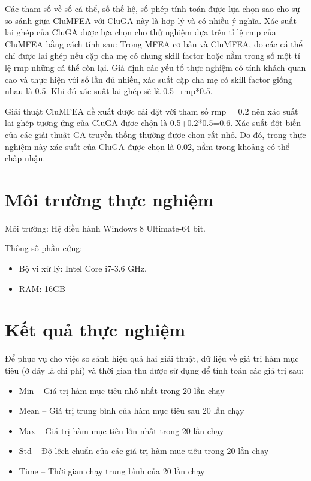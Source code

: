   

Các tham số về số cá thể, số thế hệ, số phép tính toán được lựa chọn sao cho sự so sánh giữa CluMFEA với CluGA này là hợp lý và có nhiều ý nghĩa. Xác suất lai ghép của CluGA được lựa chọn cho thử nghiệm dựa trên tỉ lệ rmp của CluMFEA bằng cách tính sau: Trong MFEA cơ bản và CluMFEA, do các cá thể chỉ được lai ghép nếu cặp cha mẹ có chung skill factor hoặc nằm trong số một tỉ lệ rmp những cá thể còn lại. Giả định các yếu tố thực nghiệm có tính khách quan cao và thực hiện với số lần đủ nhiều, xác suất cặp cha mẹ có skill factor giống nhau là 0.5. Khi đó xác suất lai ghép sẽ là 0.5+rmp*0.5.

Giải thuật CluMFEA đề xuất được cài đặt với tham số rmp = 0.2 nên xác suất lai ghép tương ứng của CluGA được chộn là 0.5+0.2*0.5=0.6. Xác suất đột biến của các giải thuật GA truyền thống thường được chọn rất nhỏ. Do đó, trong thực nghiệm này xác suất của CluGA được chọn là 0.02, nằm trong khoảng có thể chấp nhận.

\section{Môi trường thực nghiệm}
Môi trường: Hệ điều hành Windows 8 Ultimate-64 bit.

Thông số phần cứng:
\begin{itemize}
\item Bộ vi xử lý: Intel Core i7-3.6 GHz.
\item RAM: 16GB
\end{itemize}

\section{Kết quả thực nghiệm} \label{chap_mfeaProposed:sec:ketqua}
Để phục vụ cho việc so sánh hiệu quả hai giải thuật, dữ liệu về giá trị hàm mục tiêu (ở đây là chi phí) và thời gian thu được sử dụng để tính toán các giá trị sau:

\begin{itemize}
	\item Min – Giá trị hàm mục tiêu nhỏ nhất trong 20 lần chạy
	\item Mean – Giá trị trung bình của hàm mục tiêu sau 20 lần chạy
	\item Max – Giá trị hàm mục tiêu lớn nhất trong 20 lần chạy
	\item Std – Độ lệch chuẩn của các giá trị hàm mục tiêu trong 20 lần chạy
	\item Time – Thời gian chạy trung bình của 20 lần chạy
	
\end{itemize}

